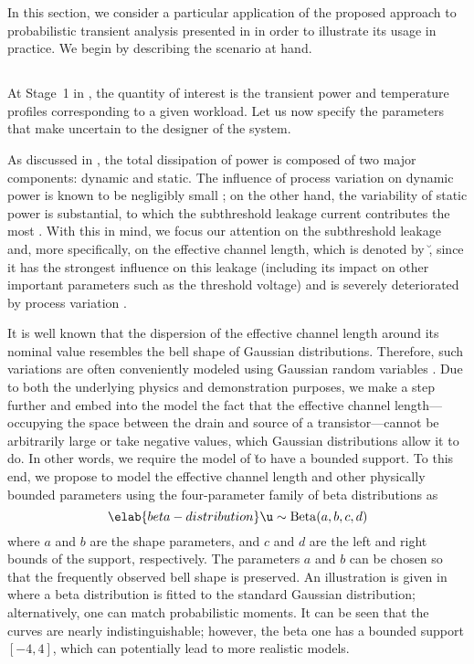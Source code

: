 In this section, we consider a particular application of the proposed approach
to probabilistic transient analysis presented in 
in order to illustrate its usage in practice. We begin by describing the
scenario at hand.

\subsection{\problemtitle}

At Stage~1 in , the quantity of interest \g is the
transient power and temperature profiles corresponding to a given workload. Let
us now specify the parameters \vu that make \g uncertain to the designer of the
system.

As discussed in , the total dissipation of power is composed
of two major components: dynamic and static. The influence of process variation
on dynamic power is known to be negligibly small \cite{srivastava2010}; on the
other hand, the variability of static power is substantial, to which the
subthreshold leakage current contributes the most \cite{juan2011, juan2012}.
With this in mind, we focus our attention on the subthreshold leakage and, more
specifically, on the effective channel length, which is denoted by \u, since it
has the strongest influence on this leakage (including its impact on other
important parameters such as the threshold voltage) and is severely deteriorated
by process variation \cite{chandrakasan2000}.

It is well known that the dispersion of the effective channel length around its
nominal value resembles the bell shape of Gaussian distributions. Therefore,
such variations are often conveniently modeled using Gaussian random variables
\cite{bhardwaj2006, ghanta2006, huang2009a, shen2009, chandra2010,
srivastava2010, juan2011, juan2012, lee2013}. Due to both the underlying physics
and demonstration purposes, we make a step further and embed into the model the
fact that the effective channel length---occupying the space between the drain
and source of a transistor---cannot be arbitrarily large or take negative
values, which Gaussian distributions allow it to do. In other words, we require
the model of \u to have a bounded support. To this end, we propose to model the
effective channel length and other physically bounded parameters using the
four-parameter family of beta distributions as
\begin{equation} \elab{beta-distribution}
  \u \sim \mathrm{Beta}(a, b, c, d)
\end{equation}
where $a$ and $b$ are the shape parameters, and $c$ and $d$ are the left and
right bounds of the support, respectively. The parameters $a$ and $b$ can be
chosen so that the frequently observed bell shape is preserved. An illustration
is given in  where a beta distribution is fitted to
the standard Gaussian distribution; alternatively, one can match probabilistic
moments. It can be seen that the curves are nearly indistinguishable; however,
the beta one has a bounded support $[-4, 4]$, which can potentially lead to more
realistic models.

